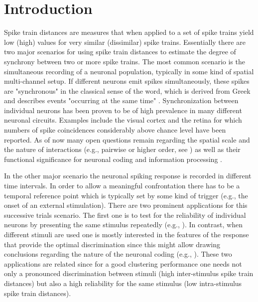 \documentclass[10pt,twocolumn]{elsart5p}
\begin{document}
\section{\label{s:Intro} Introduction}

Spike train distances are measures that when applied to a set of spike trains yield low (high) values for very similar (dissimilar) spike trains. Essentially there are two major scenarios for using spike train distances to estimate the degree of synchrony between two or more spike trains. The most common scenario is the simultaneous recording of a neuronal population, typically in some kind of spatial multi-channel setup. If different neurons emit spikes simultaneously, these spikes are "synchronous" in the classical sense of the word, which is derived from Greek and describes events "occurring at the same time" \citep{Pikovsky01}. Synchronization between individual neurons has been proven to be of high prevalence in many different neuronal circuits. Examples include the visual cortex \citep{Tiesinga08} and the retina \citep{Shlens08} for which numbers of spike coincidences considerably above chance level have been reported. As of now many open questions remain regarding the spatial scale and the nature of interactions (e.g., pairwise or higher order, see \citep{Nirenberg07}) as well as their functional significance for neuronal coding and information processing \citep{Kumar10}.

In the other major scenario the neuronal spiking response is recorded in different time intervals. In order to allow a meaningful confrontation there has to be a temporal reference point which is typically set by some kind of trigger (e.g., the onset of an external stimulation). There are two prominent applications for this successive trials scenario. The first one is to test for the reliability of individual neurons by presenting the same stimulus repeatedly (e.g., \citet{Mainen95}). In contrast, when different stimuli are used one is mostly interested in the features of the response that provide the optimal discrimination since this might allow drawing conclusions regarding the nature of the neuronal coding (e.g., \citet{Victor05}). These two applications are related since for a good clustering performance one needs not only a pronounced discrimination between stimuli (high inter-stimulus spike train distances) but also a high reliability for the same stimulus (low intra-stimulus spike train distances).
\end{document}
